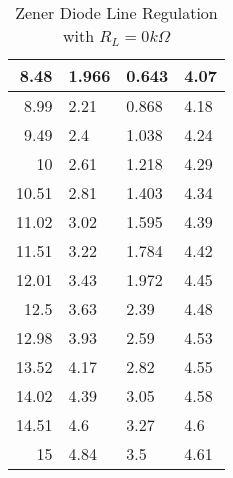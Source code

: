 \documentclass{scrartcl}
\newcommand{\1}{\mathbbm{1}}
\begin{document}
\begin{itemize}
\begin{table}[!ht]
\begin{tabular}{|r|l|l|l|}
         8.48 & 1.966 & 0.643 & 4.07 \\ \hline
         8.99 & 2.21 & 0.868 & 4.18 \\ \hline
         9.49 & 2.4 & 1.038 & 4.24 \\ \hline
         10 & 2.61 & 1.218 & 4.29 \\ \hline
         10.51 & 2.81 & 1.403 & 4.34 \\ \hline
         11.02 & 3.02 & 1.595 & 4.39 \\ \hline
         11.51 & 3.22 & 1.784 & 4.42 \\ \hline
         12.01 & 3.43 & 1.972 & 4.45 \\ \hline
         12.5 & 3.63 & 2.39 & 4.48 \\ \hline
         12.98 & 3.93 & 2.59 & 4.53 \\ \hline
         13.52 & 4.17 & 2.82 & 4.55 \\ \hline
         14.02 & 4.39 & 3.05 & 4.58 \\ \hline
         14.51 & 4.6 & 3.27 & 4.6 \\ \hline
         15 & 4.84 & 3.5 & 4.61 \\ \hline
    \end{tabular}
    \caption{Zener Diode Line Regulation with $R_L = 0 k\Omega$}
	\label{tab:ZD linereg}
\end{table} 


\end{itemize}
\end{document}
